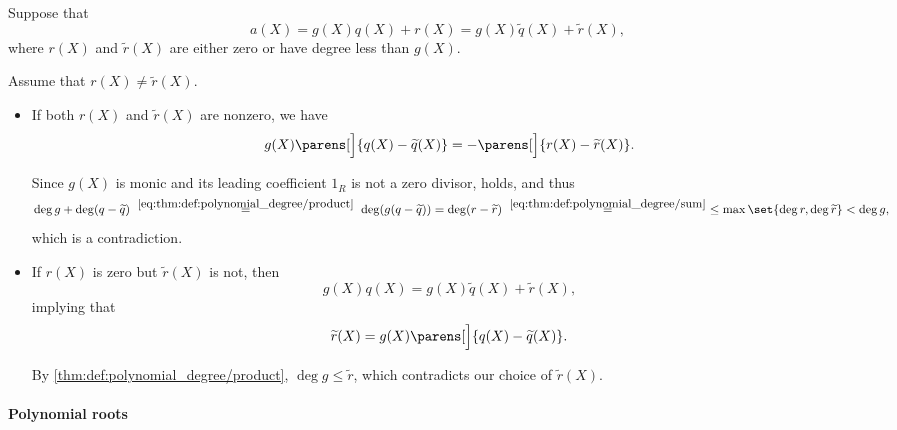 \begin{defproof}
  \UniquenessSubProof Suppose that
  \begin{equation*}
    a(X) = g(X)q(X) + r(X) = g(X) \widetilde{q}(X) + \widetilde{r}(X),
  \end{equation*}
  where \( r(X) \) and \( \widetilde{r}(X) \) are either zero or have degree less than \( g(X) \).

  Assume that \( r(X) \neq \widetilde{r}(X) \).

  \begin{itemize}
    \item If both \( r(X) \) and \( \widetilde{r}(X) \) are nonzero, we have
    \begin{equation*}
      g(X) \parens[\Big]{ q(X) - \widetilde{q}(X) } = -\parens[\Big]{ r(X) - \widetilde{r}(X) }.
    \end{equation*}

    Since \( g(X) \) is monic and its leading coefficient \( 1_R \) is not a zero divisor,  holds, and thus
    \begin{equation*}
      \deg g + \deg(q - \widetilde{q})
      \reloset {\eqref{eq:thm:def:polynomial_degree/product}} =
      \deg(g (q - \widetilde{q}))
      =
      \deg(r - \widetilde{r})
      \reloset {\eqref{eq:thm:def:polynomial_degree/sum}} =
      \leq \max\set{ \deg r, \deg \widetilde{r} }
      <
      \deg g,
    \end{equation*}
    which is a contradiction.

    \item If \( r(X) \) is zero but \( \widetilde{r}(X) \) is not, then
    \begin{equation*}
      g(X) q(X) = g(X) \widetilde{q}(X) + \widetilde{r}(X),
    \end{equation*}
    implying that
    \begin{equation*}
      \widetilde{r}(X) = g(X) \parens[\Big]{ q(X) - \widetilde{q}(X) }.
    \end{equation*}

    By \eqref{thm:def:polynomial_degree/product}, \( \deg g \leq \widetilde{r} \), which contradicts our choice of \( \widetilde{r}(X) \).
  \end{itemize}
\end{defproof}

\paragraph{Polynomial roots}

